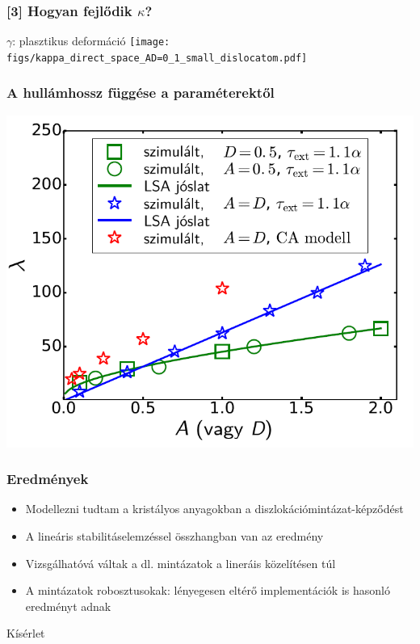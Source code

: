 \documentclass[12pt]{beamer}
\begin{document}
\begin{frame}
\frametitle{[3] Hogyan fejlődik $\kappa$?}
\centering
$\gamma$: plasztikus deformáció
\texttt{[image: figs/kappa\_direct\_space\_AD=0\_1\_small\_dislocatom.pdf]}
\end{frame}



\begin{frame}
\frametitle{A hullámhossz függése a paraméterektől}
\centering
\includegraphics[scale=0.3]{figs/fitted.png} 
\end{frame}


\begin{frame}
\frametitle{Eredmények}
\begin{itemize}
\item Modellezni tudtam a kristályos anyagokban a diszlokációmintázat-képződést
\item A lineáris stabilitáselemzéssel összhangban van az eredmény
\item Vizsgálhatóvá váltak a dl. mintázatok a lineráis közelítésen túl
\item A mintázatok robosztusokak: lényegesen eltérő implementációk is hasonló eredményt adnak
\end{itemize}
\end{frame}



\begin{frame}
\centering
\Huge Kísérlet
\end{frame}
\end{document}
